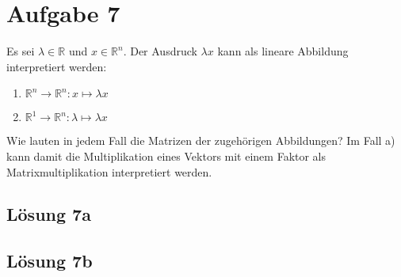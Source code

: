 \documentclass[main.tex]{subfiles}
\begin{document}
\section{Aufgabe 7}
Es sei $\lambda \in \mathbb{R}$ und $x \in \mathbb{R}^n$. Der Ausdruck $\lambda x$ kann als lineare Abbildung interpretiert werden:
\begin{enumerate}
    \item $\mathbb{R}^n \to \mathbb{R}^n : x \mapsto \lambda x$
    \item $\mathbb{R}^1 \to \mathbb{R}^n : \lambda \mapsto \lambda x$
\end{enumerate}

Wie lauten in jedem Fall die Matrizen der zugehörigen Abbildungen? Im Fall a) kann damit die
Multiplikation eines Vektors mit einem Faktor als Matrixmultiplikation interpretiert werden.

\subsection{Lösung 7a}
\subsection{Lösung 7b}
\end{document}
